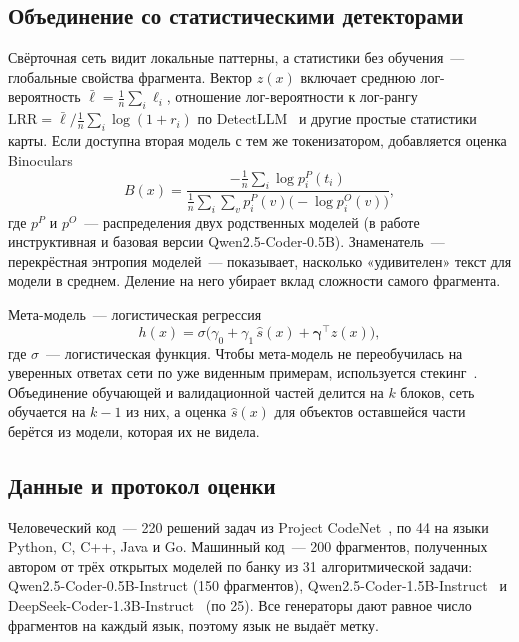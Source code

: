 \documentclass{misisarticle}
\begin{document}
\subsection{Объединение со статистическими детекторами}

Свёрточная сеть видит локальные паттерны, а статистики без обучения~--- глобальные свойства фрагмента. Вектор $z(x)$ включает среднюю лог-вероятность $\bar{\ell} = \frac{1}{n}\sum_i \ell_i$, отношение лог-вероятности к лог-рангу $\mathrm{LRR} = \bar{\ell} \big/ \frac{1}{n}\sum_i \log(1 + r_i)$ по DetectLLM~\cite{detectllm} и другие простые статистики карты. Если доступна вторая модель с тем же токенизатором, добавляется оценка Binoculars~\cite{binoculars}
\begin{equation}
  B(x) = \frac{-\frac{1}{n}\sum_i \log p^{P}_i(t_i)}{\frac{1}{n}\sum_i \sum_{v} p^{P}_i(v)\bigl(-\log p^{O}_i(v)\bigr)},
  \label{eq:binoculars}
\end{equation}
где $p^{P}$ и $p^{O}$~--- распределения двух родственных моделей (в работе инструктивная и базовая версии Qwen2.5-Coder-0.5B). Знаменатель~--- перекрёстная энтропия моделей~--- показывает, насколько «удивителен» текст для модели в среднем. Деление на него убирает вклад сложности самого фрагмента.

Мета-модель~--- логистическая регрессия
\begin{equation}
  h(x) = \sigma\bigl(\gamma_0 + \gamma_1\, \hat{s}(x) + \boldsymbol{\gamma}^{\top} z(x)\bigr),
  \label{eq:meta}
\end{equation}
где $\sigma$~--- логистическая функция. Чтобы мета-модель не переобучилась на уверенных ответах сети по уже виденным примерам, используется стекинг~\cite{stacking}. Объединение обучающей и валидационной частей делится на $k$ блоков, сеть обучается на $k-1$ из них, а оценка $\hat{s}(x)$ для объектов оставшейся части берётся из модели, которая их не видела.

\subsection{Данные и протокол оценки}

Человеческий код~--- 220 решений задач из Project CodeNet~\cite{codenet}, по 44 на языки Python, C, C++, Java и Go. Машинный код~--- 200 фрагментов, полученных автором от трёх открытых моделей по банку из 31 алгоритмической задачи: Qwen2.5-Coder-0.5B-Instruct (150 фрагментов), Qwen2.5-Coder-1.5B-Instruct~\cite{qwen25coder} и DeepSeek-Coder-1.3B-Instruct~\cite{deepseekcoder} (по 25). Все генераторы дают равное число фрагментов на каждый язык, поэтому язык не выдаёт метку.
\end{document}

